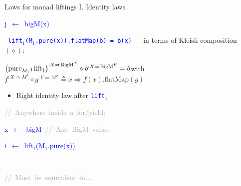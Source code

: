 \documentclass[english]{beamer}
\newenvironment{lyxcode}
  {\par\begin{list}{}{
    \setlength{\rightmargin}{\leftmargin}
    \setlength{\listparindent}{0pt}%
    \raggedright
    \setlength{\itemsep}{0pt}
    \setlength{\parsep}{0pt}
    \normalfont\ttfamily}%
   \def\{{\char`\{}
   \def\}{\char`\}}
   \def\textasciitilde{\char`\~}
   \item[]}
  {\end{list}}
\newcommand{\bef}{\hspace{0.5pt}\ensuremath\mathsmaller{\fatsemi}\hspace{1.5pt}}
\begin{document}
\begin{frame}{Laws for monad liftings I. Identity laws}
\begin{minipage}[t]{0.54\columnwidth}
\begin{lyxcode}
\textcolor{blue}{\footnotesize{}j~$\leftarrow$~bigM(x)}{\footnotesize\par}
\end{lyxcode}
%
\end{minipage}\texttt{\textcolor{blue}{\footnotesize{}\smallskip{}
lift$_{1}$(M$_{1}$.pure(x)).flatMap(b) = b(x)}} --- in terms of
Kleisli composition $\left(\diamond\right)$:
\begin{center}
{\footnotesize{}\vspace{-0.2cm}\hspace{-0.0cm}$\left(\text{pure}_{M_{1}}\bef\text{lift}_{1}\right)^{:X\Rightarrow\text{BigM}^{X}}\diamond b^{:X\Rightarrow\text{BigM}^{Y}}=b$\hspace*{\fill}with
$f^{:X\Rightarrow M^{Y}}\diamond g^{:Y\Rightarrow M^{Z}}\triangleq x\Rightarrow f(x).\text{flatMap}(g)$}{\footnotesize\par}
\par\end{center}
\begin{itemize}
\item {\footnotesize{}\vspace{-0.2cm}\hspace{-0.0cm}}Right identity law
after \texttt{\textcolor{blue}{\footnotesize{}lift$_{1}$}} 
\end{itemize}
{\footnotesize{}\vspace{-0.3cm}\hspace{-0.0cm}}\texttt{\textcolor{blue}{\footnotesize{}}}%
\begin{minipage}[t]{0.54\columnwidth}%
\begin{lyxcode}
\textrm{\textcolor{darkgray}{\footnotesize{}//~Anywhere~inside~a~for/yield:}}{\footnotesize\par}

\textcolor{blue}{\footnotesize{}x~$\leftarrow$~bigM~}\textrm{\textcolor{darkgray}{\footnotesize{}//~Any~BigM~value.}}{\footnotesize\par}

\textcolor{blue}{\footnotesize{}i~$\leftarrow$~lift$_{1}$(M$_{1}$.pure(x))}{\footnotesize\par}
\end{lyxcode}
%
\end{minipage}\texttt{\textcolor{blue}{\footnotesize{}~ }}%
\begin{minipage}[t]{0.54\columnwidth}%
\begin{lyxcode}
\textrm{\textcolor{darkgray}{\footnotesize{}//~Must~be~equivalent~to...}}{\footnotesize\par}


\end{lyxcode}
\end{minipage}
\end{frame}
\end{document}
